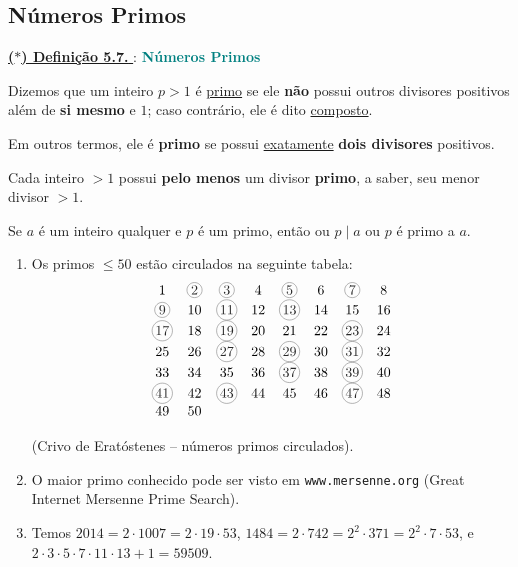 \subsection*{Números Primos}

\noindent\underline{\underline{\textbf{($\ast$) Definição 5.7. }}} : \textbf{\textcolor{teal}{Números Primos}}

Dizemos que um inteiro $p > 1$ é \underline{primo} se ele \textbf{não} possui outros divisores positivos além 
de \textbf{si mesmo} e $1$; caso contrário, ele é dito \underline{composto}.  

Em outros termos, ele é \textbf{primo} se possui \underline{exatamente} \textbf{dois divisores} positivos. 

Cada inteiro $> 1$ possui \textbf{pelo menos} um divisor \textbf{primo}, a saber, seu menor divisor $> 1$. 

Se $a$ é um inteiro qualquer e $p$ é um primo, então ou $p \mid a$ ou $p$ é primo a $a$.  

\begin{exemplo}
    \begin{enumerate}
        \item Os primos $\leq 50$ estão circulados na seguinte tabela:   
        \[
            \begin{array}{cccccccc}
            1 & \circled{2} & \circled{3} & 4 & \circled{5} & 6 & \circled{7} & 8 \\
            \circled{9} & 10 & \circled{11} & 12 & \circled{13} & 14 & 15 & 16 \\
            \circled{17} & 18 & \circled{19} & 20 & 21 & 22 & \circled{23} & 24 \\
            25 & 26 & \circled{27} & 28 & \circled{29} & 30 & \circled{31} & 32 \\
            33 & 34 & 35 & 36 & \circled{37} & 38 & \circled{39} & 40 \\
            \circled{41} & 42 & \circled{43} & 44 & 45 & 46 & \circled{47} & 48 \\
            49 & 50 &   &   &   &   &   &   
            \end{array}
        \]

        \begin{center}
            (Crivo de Eratóstenes – números primos circulados).      
        \end{center}
        
        \item O maior primo conhecido pode ser visto em \texttt{www.mersenne.org} (Great Internet Mersenne Prime Search).  
        \item Temos $2014 = 2 \cdot 1007 = 2 \cdot 19 \cdot 53$, $1484 = 2 \cdot 742 = 2^2 \cdot 371 = 2^2 \cdot 7 \cdot 53$, e $2 \cdot 3 \cdot 5 \cdot 7 \cdot 11 \cdot 13 + 1 = 59509$.  
    \end{enumerate}
\end{exemplo}

